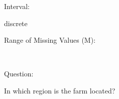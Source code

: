 \documentclass[
]{article}
\begin{document}
\begin{minipage}[t]{0.3\linewidth}

Interval:

\end{minipage}%
\begin{minipage}[t]{0.7\linewidth}

discrete

\end{minipage}

\begin{minipage}[t]{0.3\linewidth}

Range of Missing Values (M):

\end{minipage}%
\begin{minipage}[t]{0.7\linewidth}

~

\end{minipage}

\begin{minipage}[t]{0.3\linewidth}

Question:

\end{minipage}%
\begin{minipage}[t]{0.7\linewidth}

In which region is the farm located?

\end{minipage}
\end{document}
